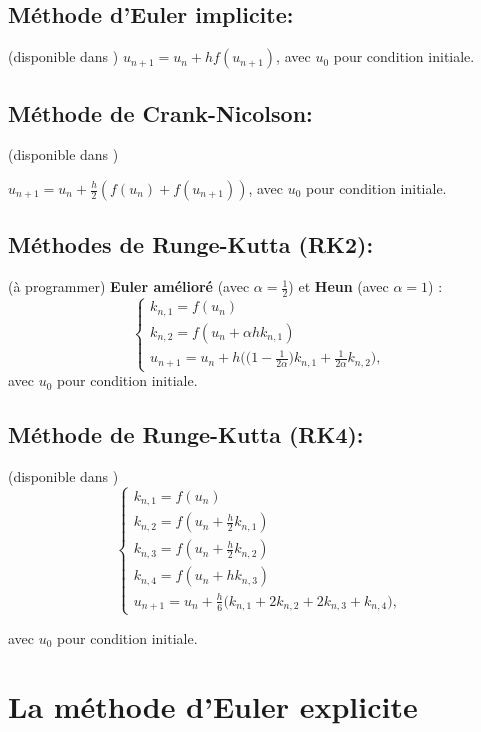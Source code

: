 \documentclass[a4paper,12pt,reqno]{amsart}
\begin{document}
\subsection*{Méthode d'Euler implicite:} (disponible dans )\newline
$ u_{n+1}=u_n+h f(u_{n+1})$, avec $u_0$ pour condition initiale.

\subsection*{Méthode de Crank-Nicolson:} (disponible dans )\newline
\smallskip
\centerline{$
u_{n+1}=u_n+\frac{h}{2}  (f(u_n)+f(u_{n+1}))$, avec $u_0$ pour condition initiale.}

\subsection*{Méthodes de Runge-Kutta (RK2):}  (à programmer)\newline
\textbf{Euler amélioré} (avec $\alpha = \frac{1}{2}$) et \textbf{Heun} (avec $\alpha=1$) :
$$
  \begin{cases}
    k_{n,1}=f(u_n)\\
    k_{n,2}=f(u_n+\alpha h k_{n,1})\\
    u_{n+1}=u_n+h \bigl( \bigl(1 - \frac{1}{2\alpha}\bigl) k_{n,1}+\frac{1}{2\alpha}k_{n,2}\bigl),
  \end{cases}
$$
avec $u_0$ pour condition initiale.

\subsection*{Méthode de Runge-Kutta (RK4):} (disponible dans )\newline
$$
  \begin{cases}
    k_{n,1}=f(u_n)\\
    k_{n,2}=f(u_n+\frac{h}{2}k_{n,1})\\[0.2cm]
    k_{n,3}=f(u_n+\frac{h}{2} k_{n,2})\\[0.2cm]
    k_{n,4}=f(u_n+h k_{n,3})\\[0.2cm]
    u_{n+1}=u_n+\frac{h}{6}\bigl( k_{n,1}+2 k_{n,2}+2 k_{n,3}+k_{n,4}\bigl),
  \end{cases}
$$

avec $u_0$ pour condition initiale.

\section{La méthode d'Euler explicite }
\end{document}
